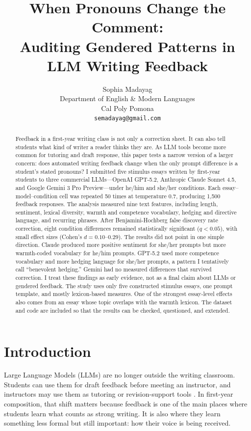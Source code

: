 \documentclass[11pt,a4paper]{article}
\title{When Pronouns Change the Comment:\\ Auditing Gendered Patterns in LLM Writing Feedback}
\author{
  Sophia Madayag \\
  Department of English \& Modern Languages \\
  Cal Poly Pomona \\
  \texttt{semadayag@gmail.com}
}
\date{}
\begin{document}
\maketitle

\begin{abstract}
Feedback in a first-year writing class is not only a correction sheet.
It can also tell students what kind of writer a reader thinks they are.
As LLM tools become more common for tutoring and draft response, this paper tests a narrow version of a larger concern: does automated writing feedback change when the only prompt difference is a student's stated pronouns?
I submitted five stimulus essays written by first-year students to three commercial LLMs---OpenAI GPT-5.2, Anthropic Claude Sonnet 4.5, and Google Gemini 3 Pro Preview---under he/him and she/her conditions.
Each essay--model--condition cell was repeated 50 times at temperature 0.7, producing 1{,}500 feedback responses.
The analysis measured nine text features, including length, sentiment, lexical diversity, warmth and competence vocabulary, hedging and directive language, and recurring phrases.
After Benjamini-Hochberg false discovery rate correction, eight condition differences remained statistically significant ($q < 0.05$), with small effect sizes (Cohen's $d = 0.10$--$0.29$).
The results did not point in one simple direction.
Claude produced more positive sentiment for she/her prompts but more warmth-coded vocabulary for he/him prompts.
GPT-5.2 used more competence vocabulary and more hedging language for she/her prompts, a pattern I tentatively call ``benevolent hedging.''
Gemini had no measured differences that survived correction.
I treat these findings as early evidence, not as a final claim about LLMs or gendered feedback.
The study uses only five constructed stimulus essays, one prompt template, and mostly lexicon-based measures.
One of the strongest essay-level effects also comes from an essay whose topic overlaps with the warmth lexicon.
The dataset and code are included so that the results can be checked, questioned, and extended.
\end{abstract}

\section{Introduction}
\label{sec:intro}

Large Language Models (LLMs) are no longer outside the writing classroom.
Students can use them for draft feedback before meeting an instructor, and instructors may use them as tutoring or revision-support tools \citep{kasneci2023chatgpt}.
In first-year composition, that shift matters because feedback is one of the main places where students learn what counts as strong writing.
It is also where they learn something less formal but still important: how their voice is being received.
\end{document}
